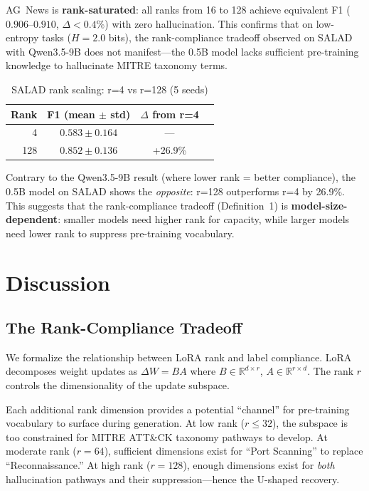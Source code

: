 \documentclass[journal]{IEEEtran}
\begin{document}
AG~News is \textbf{rank-saturated}: all ranks from 16 to 128 achieve equivalent F1 ($0.906$--$0.910$, $\Delta < 0.4\%$) with zero hallucination. This confirms that on low-entropy tasks ($H=2.0$ bits), the rank-compliance tradeoff observed on SALAD with Qwen3.5-9B does not manifest---the 0.5B model lacks sufficient pre-training knowledge to hallucinate MITRE taxonomy terms.

\begin{table}[!ht]
\centering
\caption{SALAD rank scaling: r=4 vs r=128 (5 seeds)}
\label{tab:salad-rank}
\begin{tabular}{rccc}
\toprule
\textbf{Rank} & \textbf{F1 (mean $\pm$ std)} & \textbf{$\Delta$ from r=4} \\
\midrule
4 & $0.583 \pm 0.164$ & --- \\
128 & $\mathbf{0.852 \pm 0.136}$ & +26.9\% \\
\bottomrule
\end{tabular}
\end{table}

Contrary to the Qwen3.5-9B result (where lower rank = better compliance), the 0.5B model on SALAD shows the \emph{opposite}: r=128 outperforms r=4 by 26.9\%. This suggests that the rank-compliance tradeoff (Definition~1) is \textbf{model-size-dependent}: smaller models need higher rank for capacity, while larger models need lower rank to suppress pre-training vocabulary.

\section{Discussion}

\subsection{The Rank-Compliance Tradeoff}
We formalize the relationship between LoRA rank and label compliance. LoRA decomposes weight updates as $\Delta W = BA$ where $B \in \mathbb{R}^{d \times r}$, $A \in \mathbb{R}^{r \times d}$. The rank $r$ controls the dimensionality of the update subspace.

Each additional rank dimension provides a potential ``channel'' for pre-training vocabulary to surface during generation. At low rank ($r \leq 32$), the subspace is too constrained for MITRE ATT\&CK taxonomy pathways to develop. At moderate rank ($r = 64$), sufficient dimensions exist for ``Port Scanning'' to replace ``Reconnaissance.'' At high rank ($r = 128$), enough dimensions exist for \emph{both} hallucination pathways and their suppression---hence the U-shaped recovery.
\end{document}
